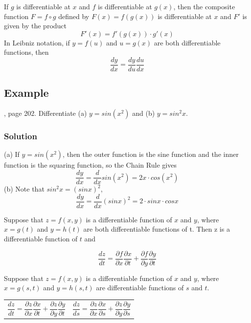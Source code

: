 \begin{definition}
If $g$ is differentiable at $x$ and $f$ is differentiable at $g(x)$, then the composite function $F=f \circ g$ defined by $F(x)=f(g(x))$ is differentiable at $x$ and $F'$ is given by the product
    \begin{equation}
	   \label{eq:9}
	   F'(x) = f'(g(x)) \cdot g'(x)
    \end{equation}
In Leibniz notation, if $y=f(u)$ and $u=g(x)$ are both differentiable functions, then
    \begin{equation}
	   \label{eq:10}
	   \frac{dy}{dx}=\frac{dy}{du}\frac{du}{dx}
    \end{equation}
\end{definition}

\subsection{Example}

\cite{calculus}, page 202. Differentiate (a) $y=sin(x^2)$ and (b) $y=sin^2x$.

\subsubsection{Solution}
(a) If $y=sin(x^2)$, then the outer function is the sine function and the inner function is the squaring function, so the Chain Rule gives
$$
    \frac{dy}{dx}=\frac{d}{dx}sin(x^2)=2x \cdot cos(x^2)
$$
(b) Note that $sin^2x=(sinx)^2$,
$$
    \frac{dy}{dx}=\frac{d}{dx}(sinx)^2=2 \cdot sinx \cdot cosx
$$

\begin{definition}
Suppose that $z=f(x, y)$ is a differentiable function of $x$ and $y$, where $x=g(t)$ and $y=h(t)$ are both differentiable functions of t. Then z is a differentiable function of $t$ and

    \begin{equation}
        \label{Chain Rule Case 1}
        \frac{dz}{dt}=\frac{\partial f}{\partial x}\frac{\partial x}{\partial t} + \frac{\partial f}{\partial y}\frac{\partial y}{\partial t}
    \end{equation}
\end{definition}

\begin{definition}
    Suppose that $z=f(x, y)$ is a differentiable function of $x$ and $y$, where $x=g(s, t)$ and $y=h(s, t)$ are differentiable functions of $s$ and $t$.
\end{definition}
\noindent
\begin{tabularx}{\linewidth}{@{}XX@{}}
    \begin{equation}
        \label{Chain Rule Case 2}
        \frac{dz}{dt}=\frac{\partial z}{\partial x}\frac{\partial x}{\partial t} + \frac{\partial z}{\partial y}\frac{\partial y}{\partial t}
    \end{equation}
    &
    \begin{equation}
        \label{Chain Rule Case 2}
        \frac{dz}{ds}=\frac{\partial z}{\partial x}\frac{\partial x}{\partial s} + \frac{\partial z}{\partial y}\frac{\partial y}{\partial s}
    \end{equation}
\end{tabularx}

